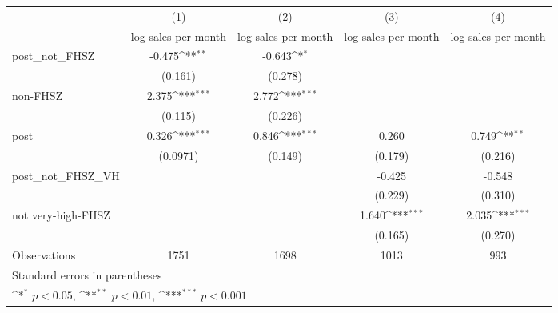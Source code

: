 {
\def\sym#1{\ifmmode^{#1}\else\(^{#1}\)\fi}
\begin{tabular}{l*{4}{c}}
\hline\hline
                    &\multicolumn{1}{c}{(1)}&\multicolumn{1}{c}{(2)}&\multicolumn{1}{c}{(3)}&\multicolumn{1}{c}{(4)}\\
                    &\multicolumn{1}{c}{log sales per month}&\multicolumn{1}{c}{log sales per month}&\multicolumn{1}{c}{log sales per month}&\multicolumn{1}{c}{log sales per month}\\
\hline
post\_not\_FHSZ       &      -0.475\sym{**} &      -0.643\sym{*}  &                     &                     \\
                    &     (0.161)         &     (0.278)         &                     &                     \\
[1em]
non-FHSZ            &       2.375\sym{***}&       2.772\sym{***}&                     &                     \\
                    &     (0.115)         &     (0.226)         &                     &                     \\
[1em]
post                &       0.326\sym{***}&       0.846\sym{***}&       0.260         &       0.749\sym{**} \\
                    &    (0.0971)         &     (0.149)         &     (0.179)         &     (0.216)         \\
[1em]
post\_not\_FHSZ\_VH    &                     &                     &      -0.425         &      -0.548         \\
                    &                     &                     &     (0.229)         &     (0.310)         \\
[1em]
not very-high-FHSZ  &                     &                     &       1.640\sym{***}&       2.035\sym{***}\\
                    &                     &                     &     (0.165)         &     (0.270)         \\
\hline
Observations        &        1751         &        1698         &        1013         &         993         \\
\hline\hline
\multicolumn{5}{l}{\footnotesize Standard errors in parentheses}\\
\multicolumn{5}{l}{\footnotesize \sym{*} \(p<0.05\), \sym{**} \(p<0.01\), \sym{***} \(p<0.001\)}\\
\end{tabular}
}
